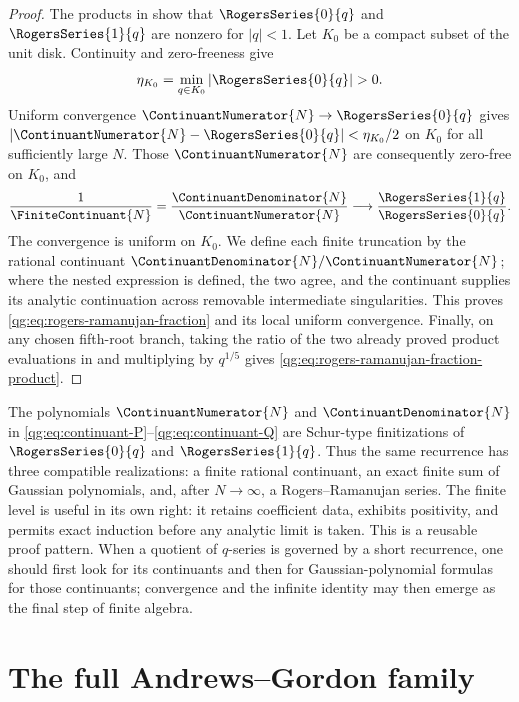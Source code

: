 \begin{proof}
The products in  show that
\(\RogersSeries{0}{q}\) and \(\RogersSeries{1}{q}\) are nonzero for
\(|q|<1\).  Let \(K_0\) be a compact subset of
the unit disk.  Continuity and zero-freeness give
\[
  \eta_{K_0}=\min_{q\in K_0}|\RogersSeries{0}{q}|>0.
\]
Uniform convergence
\(\ContinuantNumerator{N}\to\RogersSeries{0}{q}\) gives
\(|\ContinuantNumerator{N}-\RogersSeries{0}{q}|<\eta_{K_0}/2\) on
\(K_0\) for all sufficiently large \(N\).  Those
\(\ContinuantNumerator{N}\) are consequently zero-free on \(K_0\), and
\[
  \frac1{\FiniteContinuant{N}}
  =\frac{\ContinuantDenominator{N}}{\ContinuantNumerator{N}}
  \longrightarrow
  \frac{\RogersSeries{1}{q}}{\RogersSeries{0}{q}}.
\]
The convergence is uniform on \(K_0\).  We define each finite truncation by
the rational continuant
\(\ContinuantDenominator{N}/\ContinuantNumerator{N}\); where the nested
expression is defined,
the two agree, and the continuant supplies its analytic continuation across
removable intermediate singularities.  This proves
\eqref{qg:eq:rogers-ramanujan-fraction} and its local uniform convergence.
Finally, on any chosen fifth-root branch, taking the ratio of the two already
proved product evaluations in  and multiplying by
\(q^{1/5}\) gives
\eqref{qg:eq:rogers-ramanujan-fraction-product}.
\end{proof}

\begin{remark}
The polynomials \(\ContinuantNumerator{N}\) and
\(\ContinuantDenominator{N}\) in
\eqref{qg:eq:continuant-P}--\eqref{qg:eq:continuant-Q} are Schur-type
finitizations of \(\RogersSeries{0}{q}\) and \(\RogersSeries{1}{q}\).
Thus the same recurrence has three
compatible realizations: a finite rational continuant, an exact finite sum of
Gaussian polynomials, and, after \(N\to\infty\), a Rogers--Ramanujan series.
The finite level is useful in its own right: it retains coefficient data,
exhibits positivity, and permits exact induction before any analytic limit is
taken.  This is a reusable proof pattern.  When a quotient of \(q\)-series is
governed by a short recurrence, one should first look for its continuants and
then for Gaussian-polynomial formulas for those continuants; convergence and
the infinite identity may then emerge as the final step of finite algebra.
\end{remark}

\section{The full Andrews--Gordon family}
\label{qg:sec:andrews-gordon}

